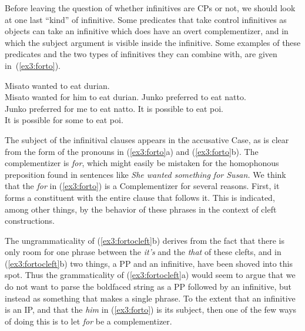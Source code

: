 Before leaving the question of whether infinitives are CPs or not, we should look at one last ``kind'' of infinitive. Some predicates that take control infinitives as objects can take an infinitive which does have an overt complementizer, and in which the subject argument is visible inside the infinitive. Some examples of these predicates and the two types of infinitives they can combine with, are given in~(\ref{ex3:forto}).
\begin{exe}
\ex \label{ex3:forto} 
\begin{xlist}
	\ex Misato wanted to eat durian.\\
		Misato wanted for him to eat durian.
	\ex Junko preferred to eat natto.\\
		Junko preferred for me to eat natto.
	\ex It is possible to eat poi.\\
		 It is possible for some to eat poi.
\end{xlist}
\end{exe}
The subject of the infinitival clauses appears in the accusative Case, as is clear from the form of the pronouns in (\ref{ex3:forto}a) and (\ref{ex3:forto}b). The complementizer is \emph{for}, which might easily be mistaken for the homophonous preposition found in sentences like \emph{She wanted something for Susan.} We think that the \emph{for} in (\ref{ex3:forto}) is a Complementizer for several reasons. First, it forms a constituent with the entire clause that follows it. This is indicated, among other things, by the behavior of these phrases in the context of cleft constructions.
\begin{exe}
	\ex \label{ex3:fortocleft} 
	\begin{xlist}
	\end{xlist}
\end{exe}
The ungrammaticality of (\ref{ex3:fortocleft}b) derives from the fact that there is only room for one phrase between the \emph{it's} and the \emph{that} of these clefts, and in (\ref{ex3:fortocleft}b) two things, a PP and an infinitive, have been shoved into this spot. Thus the grammaticality of (\ref{ex3:fortocleft}a) would seem to argue that we do not want to parse the boldfaced string as a PP followed by an infinitive, but instead as something that makes a single phrase. To the extent that an infinitive is an IP, and that the \emph{him} in (\ref{ex3:forto}) is its subject, then one of the few ways of doing this is to let \emph{for} be a complementizer.

